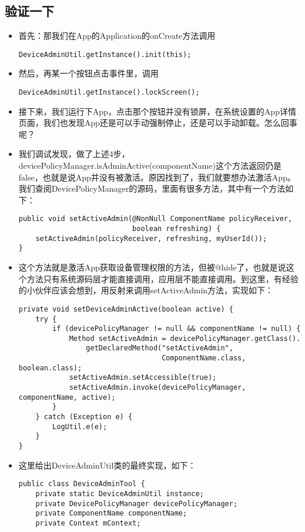 \documentclass[9pt, b5paper]{article}
\begin{document}
\subsection{验证一下}
\label{sec-1-2}
\begin{itemize}
\item 首先：那我们在App的Application的onCreate方法调用
\begin{verbatim}
DeviceAdminUtil.getInstance().init(this);
\end{verbatim}
\item 然后，再某一个按钮点击事件里，调用
\begin{verbatim}
DeviceAdminUtil.getInstance().lockScreen();
\end{verbatim}
\item 接下来，我们运行下App，点击那个按钮并没有锁屏，在系统设置的App详情页面，我们也发现App还是可以手动强制停止，还是可以手动卸载。怎么回事呢？
\item 我们调试发现，做了上述4步，devicePolicyManager.isAdminActive(componentName)这个方法返回仍是false，也就是说App并没有被激活。原因找到了，我们就要想办法激活App。我们查阅DevicePolicyManager的源码，里面有很多方法，其中有一个方法如下：
\begin{verbatim}
public void setActiveAdmin(@NonNull ComponentName policyReceiver,
                           boolean refreshing) {
    setActiveAdmin(policyReceiver, refreshing, myUserId());
}
\end{verbatim}
\item 这个方法就是激活App获取设备管理权限的方法，但被@hide了，也就是说这个方法只有系统源码层才能直接调用，应用层不能直接调用。到这里，有经验的小伙伴应该会想到，用反射来调用setActiveAdmin方法，实现如下：
\begin{verbatim}
private void setDeviceAdminActive(boolean active) {
    try {
        if (devicePolicyManager != null && componentName != null) {
            Method setActiveAdmin = devicePolicyManager.getClass().
                getDeclaredMethod("setActiveAdmin",
                                  ComponentName.class, boolean.class);
            setActiveAdmin.setAccessible(true);
            setActiveAdmin.invoke(devicePolicyManager, componentName, active);
        }
    } catch (Exception e) {
        LogUtil.e(e);
    }
}
\end{verbatim}
\item 这里给出DeviceAdminUtil类的最终实现，如下：
\begin{verbatim}
public class DeviceAdminTool {
    private static DeviceAdminUtil instance;
    private DevicePolicyManager devicePolicyManager;
    private ComponentName componentName;
    private Context mContext;


\end{verbatim}
\end{itemize}
\end{document}
